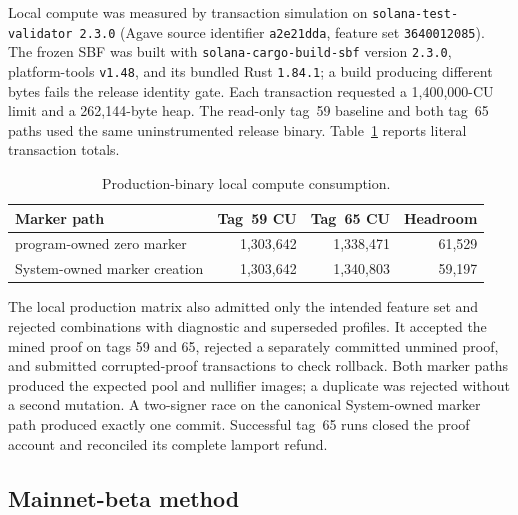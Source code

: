 Local compute was measured by transaction simulation on
\texttt{solana-test-validator 2.3.0} (Agave source identifier
\texttt{a2e21dda}, feature set \texttt{3640012085}).  The frozen SBF was built
with \nolinkurl{solana-cargo-build-sbf} version \texttt{2.3.0}, platform-tools
\texttt{v1.48}, and its bundled Rust \texttt{1.84.1}; a build producing
different bytes fails the release identity gate.  Each transaction
requested a 1,400,000-CU limit and a 262,144-byte heap.  The read-only tag~59
baseline and both tag~65 paths used the same uninstrumented release binary.
Table~\ref{tab:production-cu} reports literal transaction totals.

\begin{table}[t]
  \centering
  \small
  \caption{Production-binary local compute consumption.}
  \label{tab:production-cu}
  \begin{tabular}{l r r r}
    \toprule
    Marker path & Tag~59 CU & Tag~65 CU & Headroom \\
    \midrule
    program-owned zero marker & 1,303,642 & 1,338,471 & 61,529 \\
    System-owned marker creation & 1,303,642 & 1,340,803 & 59,197 \\
    \bottomrule
  \end{tabular}
\end{table}

The local production matrix also admitted only the intended feature set and
rejected combinations with diagnostic and superseded profiles.  It accepted
the mined proof on tags 59 and 65, rejected a separately committed unmined
proof, and submitted corrupted-proof transactions to check rollback.  Both
marker paths produced the expected pool and nullifier images; a duplicate was
rejected without a second mutation.  A two-signer race on the canonical
System-owned marker path produced exactly one commit.  Successful tag~65 runs
closed the proof account and reconciled its complete lamport refund.

\subsection{Mainnet-beta method}
\label{sec:evaluation-mainnet-method}

